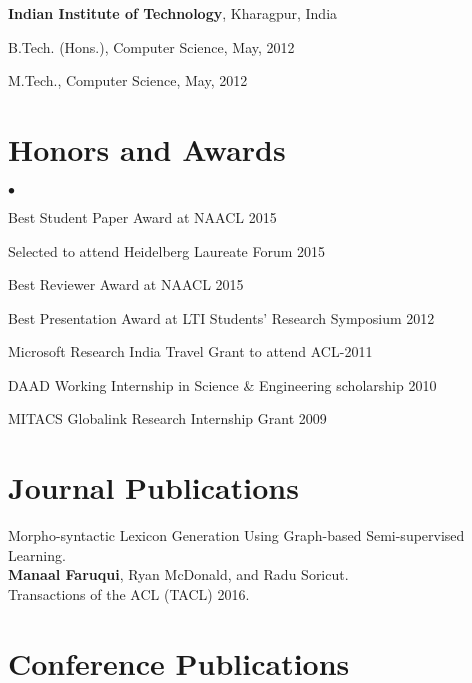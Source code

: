 \documentclass[margin,line]{res}
\newenvironment{list1}{
  \begin{list}{\ding{113}}{%
      \setlength{\itemsep}{0in}
      \setlength{\parsep}{0in} \setlength{\parskip}{0in}
      \setlength{\topsep}{0in} \setlength{\partopsep}{0in}
      \setlength{\leftmargin}{0.17in}}}{\end{list}}
\newenvironment{list2}{
  \begin{list}{$\bullet$}{%
      \setlength{\itemsep}{0in}
      \setlength{\parsep}{0in} \setlength{\parskip}{0in}
      \setlength{\topsep}{0in} \setlength{\partopsep}{0in}
      \setlength{\leftmargin}{0.2in}}}{\end{list}}
\begin{document}
\begin{resume}
{\bf Indian Institute of Technology}, Kharagpur, India\\
\vspace*{-.1in}
\begin{list1}
\item[] B.Tech. (Hons.), Computer Science,  May, 2012
\item[] M.Tech., Computer Science, May, 2012
\end{list1}

\section{\sc Honors and Awards}

\begin{list2}
\item Best Student Paper Award at NAACL 2015
\item Selected to attend Heidelberg Laureate Forum 2015
\item Best Reviewer Award at NAACL 2015
\item Best Presentation Award at LTI Students' Research Symposium 2012
\item Microsoft Research India Travel Grant to attend ACL-2011
\item DAAD Working Internship in Science \& Engineering scholarship 2010
\item MITACS Globalink Research Internship Grant 2009
\end{list2}

\vspace{.2cm}
\section{\sc Journal Publications}

Morpho-syntactic Lexicon Generation Using Graph-based Semi-supervised Learning.\\
\textbf{Manaal Faruqui}, Ryan McDonald, and Radu Soricut.\\
Transactions of the ACL (TACL) 2016.

\vspace{.2cm}
\section{\sc Conference Publications}


\end{resume}
\end{document}
